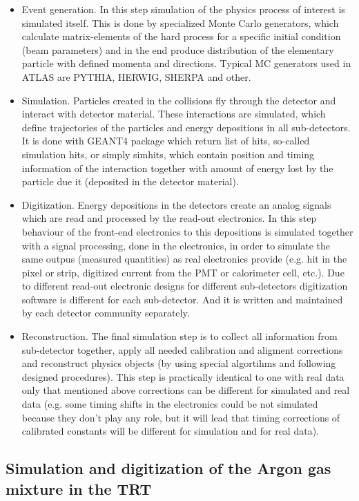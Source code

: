 \begin{itemize}
 \item Event generation. In this step simulation of the physics process of interest is simulated itself. This is done by specialized Monte Carlo generators, which calculate matrix-elements of the
 hard process for a specific initial condition (beam parameters) and in the end produce distribution of the elementary particle with defined momenta and directions. Typical MC generators used in ATLAS
 are PYTHIA, HERWIG, SHERPA and other.
 \item Simulation. Particles created in the collisions fly through the detector and interact with detector material. These interactions are simulated, which define trajectories of the particles and
 energy depositions in all sub-detectors. 
 It is done with GEANT4 package which return list of hits, so-called simulation hits, or simply simhits, which contain position and timing information of 
 the interaction together with amount of energy lost by the particle due it (deposited in the detector material).
 \item Digitization. Energy depositions in the detectors create an analog signals which are read and processed by the read-out electronics. In this step behaviour of the front-end electronics to this
 depositions is simulated together with a signal processing, done in the electronics, in order to simulate the same outpus (measured quantities) as real electronics provide (e.g. hit in the pixel or strip,
 digitized current from the PMT or calorimeter cell, etc.). Due to different read-out electronic designs for different sub-detectors digitization software is different for each sub-detector.
 And it is written and maintained by each detector community separately.
 \item Reconstruction. The final simulation step is to collect all information from sub-detector together, apply all needed calibration and aligment corrections and reconstruct physics objects 
 (by using special algortihms and following designed procedures). This step is practically identical to one with real data only that mentioned above corrections can be different for simulated and real 
 data (e.g. some timing shifts in the electronics could be not simulated because they don't play any role, but it will lead that timing corrections of calibrated constants will be different 
 for simulation and for real data).
\end{itemize}

\subsection{Simulation and digitization of the Argon gas mixture in the TRT}
\label{subsec:TRT:argonImpl}

